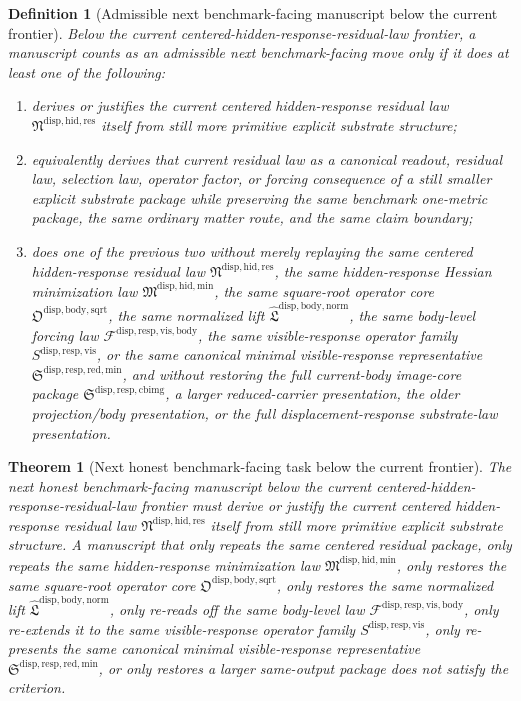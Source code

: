 \documentclass[11pt]{article}
\newcommand{\ResidualLawPackage}{\mathfrak N^{\mathrm{disp,hid,res}}}
\newcommand{\HiddenMinimizationPackage}{\mathfrak M^{\mathrm{disp,hid,min}}}
\newcommand{\SquareRootOperatorCore}{\mathfrak O^{\mathrm{disp,body,sqrt}}}
\newcommand{\NormalizedLiftPackage}{\widehat{\mathfrak L}^{\mathrm{disp,body,norm}}}
\newcommand{\VisibleBodyForcingLaw}{\mathscr F^{\mathrm{disp,resp,vis,body}}}
\newcommand{\VisibleResponseOperator}{S^{\mathrm{disp,resp,vis}}}
\newcommand{\MinimalReducedStructure}{\mathfrak S^{\mathrm{disp,resp,red,min}}}
\newcommand{\CurrentBodyImageCore}{\mathfrak S^{\mathrm{disp,resp,cbimg}}}
\newtheorem{definition}{Definition}
\newtheorem{theorem}{Theorem}
\begin{document}
\begin{definition}[Admissible next benchmark-facing manuscript below the current frontier]
Below the current centered-hidden-response-residual-law frontier, a manuscript counts as an admissible next benchmark-facing move only if it does at least one of the following:
\begin{enumerate}
    \item derives or justifies the current centered hidden-response residual law \(\ResidualLawPackage\) itself from still more primitive explicit substrate structure;
    \item equivalently derives that current residual law as a canonical readout, residual law, selection law, operator factor, or forcing consequence of a still smaller explicit substrate package while preserving the same benchmark one-metric package, the same ordinary matter route, and the same claim boundary;
    \item does one of the previous two without merely replaying the same centered hidden-response residual law \(\ResidualLawPackage\), the same hidden-response Hessian minimization law \(\HiddenMinimizationPackage\), the same square-root operator core \(\SquareRootOperatorCore\), the same normalized lift \(\NormalizedLiftPackage\), the same body-level forcing law \(\VisibleBodyForcingLaw\), the same visible-response operator family \(\VisibleResponseOperator\), or the same canonical minimal visible-response representative \(\MinimalReducedStructure\), and without restoring the full current-body image-core package \(\CurrentBodyImageCore\), a larger reduced-carrier presentation, the older projection/body presentation, or the full displacement-response substrate-law presentation.
\end{enumerate}
\end{definition}

\begin{theorem}[Next honest benchmark-facing task below the current frontier]
The next honest benchmark-facing manuscript below the current centered-hidden-response-residual-law frontier must derive or justify the current centered hidden-response residual law \(\ResidualLawPackage\) itself from still more primitive explicit substrate structure. A manuscript that only repeats the same centered residual package, only repeats the same hidden-response minimization law \(\HiddenMinimizationPackage\), only restores the same square-root operator core \(\SquareRootOperatorCore\), only restores the same normalized lift \(\NormalizedLiftPackage\), only re-reads off the same body-level law \(\VisibleBodyForcingLaw\), only re-extends it to the same visible-response operator family \(\VisibleResponseOperator\), only re-presents the same canonical minimal visible-response representative \(\MinimalReducedStructure\), or only restores a larger same-output package does not satisfy the criterion.
\end{theorem}
\end{document}
